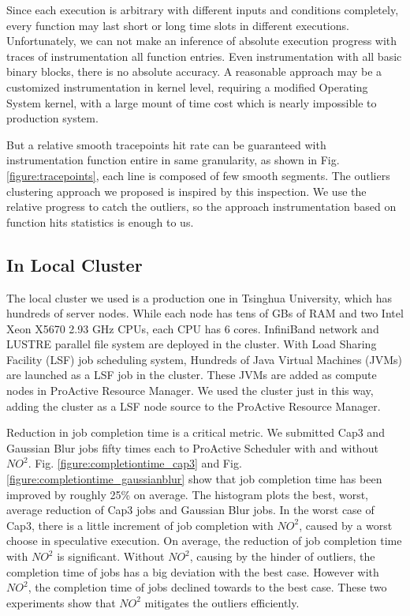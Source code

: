 Since each execution is arbitrary with different inputs and conditions completely, every function may last short or long time slots in different executions. Unfortunately, we can not make an inference of absolute execution progress with traces of instrumentation all function entries. Even instrumentation with all basic binary blocks, there is no absolute accuracy. A reasonable approach may be a customized instrumentation in kernel level, requiring a modified Operating System kernel, with a large mount of time cost which is nearly impossible to production system.

But a relative smooth tracepoints hit rate can be guaranteed with instrumentation function entire in same granularity, as shown in Fig. \ref{figure:tracepoints}, each line is composed of few smooth segments. The outliers clustering approach we proposed is inspired by this inspection. We use the relative progress to catch the outliers, so the approach instrumentation based on function hits statistics is enough to us.

\subsection{In Local Cluster}

The local cluster we used is a production one in Tsinghua University, which has hundreds of  server nodes. While each node has tens of GBs of RAM and two Intel Xeon X5670 2.93 GHz CPUs, each CPU has 6 cores. InfiniBand network and LUSTRE parallel file system are deployed in the cluster. With Load Sharing Facility (LSF) job scheduling system, Hundreds of Java Virtual Machines (JVMs) are launched as a LSF job in the cluster. These JVMs are added as compute nodes in ProActive Resource Manager. We used the cluster just in this way, adding the cluster as a LSF node source to the ProActive Resource Manager.

Reduction in job completion time is a critical metric. We submitted Cap3 and Gaussian Blur jobs fifty times each to ProActive Scheduler with and without $NO^2$. Fig. \ref{figure:completiontime_cap3} and Fig. \ref{figure:completiontime_gaussianblur} show that job completion time has been improved by roughly 25\% on average. The histogram plots the best, worst, average reduction of Cap3 jobs and Gaussian Blur jobs. In the worst case of Cap3, there is a little increment of job completion with $NO^2$, caused by a worst choose in speculative execution. On average, the reduction of job completion time with $NO^2$ is significant. Without $NO^2$, causing by the hinder of outliers, the completion time of jobs has a big deviation with the best case. However with $NO^2$, the completion time of jobs declined towards to the best case. These two experiments show that $NO^2$ mitigates the outliers efficiently.

